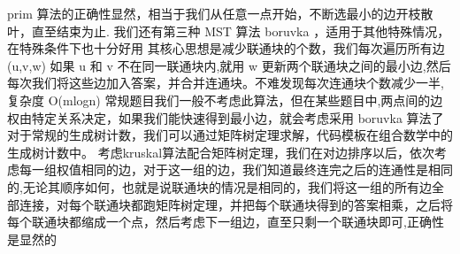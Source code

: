 {}\markdownRendererDollarSign{} prim \markdownRendererDollarSign{}算法的正确性显然，相当于我们从任意一点开始，不断选最小的边开枝散叶，直至结束为止.\markdownRendererInterblockSeparator
{}
\markdownRendererSectionEnd \markdownRendererSectionBegin
{}\markdownRendererInterblockSeparator
{}\markdownRendererInterblockSeparator
{}我们还有第三种\markdownRendererDollarSign{} MST \markdownRendererDollarSign{}算法\markdownRendererDollarSign{} boruvka \markdownRendererDollarSign{}，适用于其他特殊情况，在特殊条件下也十分好用\markdownRendererParagraphSeparator
{}其核心思想是减少联通块的个数，我们每次遍历所有边\markdownRendererDollarSign{} (u,v,w) \markdownRendererDollarSign{}如果\markdownRendererDollarSign{} u \markdownRendererDollarSign{}和\markdownRendererDollarSign{} v \markdownRendererDollarSign{}不在同一联通块内,就用\markdownRendererDollarSign{} w \markdownRendererDollarSign{}更新两个联通块之间的最小边,然后每次我们将这些边加入答案，并合并连通块。不难发现每次连通块个数减少一半,复杂度\markdownRendererDollarSign{} O(mlogn) \markdownRendererDollarSign{}\markdownRendererParagraphSeparator
{}常规题目我们一般不考虑此算法，但在某些题目中,两点间的边权由特定关系决定，如果我们能快速得到最小边，就会考虑采用\markdownRendererDollarSign{} boruvka \markdownRendererDollarSign{}算法了\markdownRendererInterblockSeparator
{}
\markdownRendererSectionEnd \markdownRendererSectionBegin
{}\markdownRendererInterblockSeparator
{}\markdownRendererInterblockSeparator
{}
\markdownRendererSectionEnd 
\markdownRendererSectionEnd \markdownRendererSectionBegin
{}\markdownRendererInterblockSeparator
{}对于常规的生成树计数，我们可以通过矩阵树定理求解，代码模板在组合数学中的生成树计数中。\markdownRendererInterblockSeparator
{}\markdownRendererSectionBegin
{}\markdownRendererInterblockSeparator
{}考虑kruskal算法配合矩阵树定理，我们在对边排序以后，依次考虑每一组权值相同的边，对于这一组的边，我们知道最终连完之后的连通性是相同的,无论其顺序如何，也就是说联通块的情况是相同的，我们将这一组的所有边全部连接，对每个联通块都跑矩阵树定理，并把每个联通块得到的答案相乘，之后将每个联通块都缩成一个点，然后考虑下一组边，直至只剩一个联通块即可,正确性是显然的\markdownRendererInterblockSeparator
{}
\markdownRendererSectionEnd 
\markdownRendererSectionEnd \markdownRendererSectionBegin
